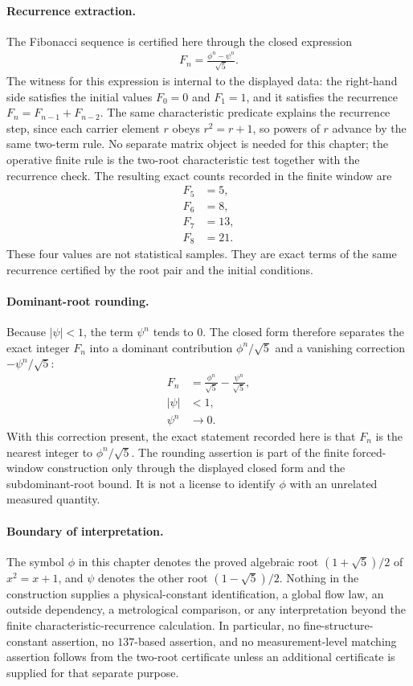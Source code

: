 \paragraph{Recurrence extraction.}
The Fibonacci sequence is certified here through the closed expression
$$
\begin{aligned}
F_n = \frac{\phi^n-\psi^n}{\sqrt{5}}.
\end{aligned}
$$
The witness for this expression is internal to the displayed data: the right-hand side satisfies the initial values $F_0=0$ and $F_1=1$, and it satisfies the recurrence $F_n=F_{n-1}+F_{n-2}$.  The same characteristic predicate explains the recurrence step, since each carrier element $r$ obeys $r^2=r+1$, so powers of $r$ advance by the same two-term rule.  No separate matrix object is needed for this chapter; the operative finite rule is the two-root characteristic test together with the recurrence check.  The resulting exact counts recorded in the finite window are
$$
\begin{aligned}
F_5 &= 5,\\
F_6 &= 8,\\
F_7 &= 13,\\
F_8 &= 21.
\end{aligned}
$$
These four values are not statistical samples.  They are exact terms of the same recurrence certified by the root pair and the initial conditions.

\paragraph{Dominant-root rounding.}
Because $|\psi|<1$, the term $\psi^n$ tends to $0$.  The closed form therefore separates the exact integer $F_n$ into a dominant contribution $\phi^n/\sqrt{5}$ and a vanishing correction $-\psi^n/\sqrt{5}$:
$$
\begin{aligned}
F_n &= \frac{\phi^n}{\sqrt{5}} - \frac{\psi^n}{\sqrt{5}},\\
|\psi| &< 1,\\
\psi^n &\to 0.
\end{aligned}
$$
With this correction present, the exact statement recorded here is that $F_n$ is the nearest integer to $\phi^n/\sqrt{5}$.  The rounding assertion is part of the finite forced-window construction only through the displayed closed form and the subdominant-root bound.  It is not a license to identify $\phi$ with an unrelated measured quantity.

\paragraph{Boundary of interpretation.}
The symbol $\phi$ in this chapter denotes the proved algebraic root $(1+\sqrt{5})/2$ of $x^2=x+1$, and $\psi$ denotes the other root $(1-\sqrt{5})/2$.  Nothing in the construction supplies a physical-constant identification, a global flow law, an outside dependency, a metrological comparison, or any interpretation beyond the finite characteristic-recurrence calculation.  In particular, no fine-structure-constant assertion, no $137$-based assertion, and no measurement-level matching assertion follows from the two-root certificate unless an additional certificate is supplied for that separate purpose.